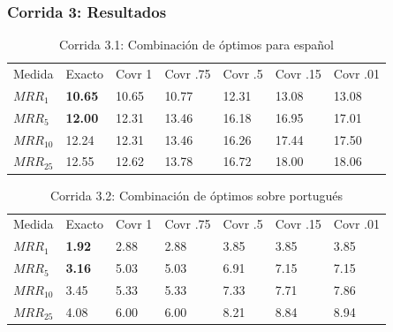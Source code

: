 \begin{frame}
\frametitle{Corrida 3: Resultados}


\begin{table}
\centering
\begin{center}
\begin{tabular}{|l | l | l | l | l | l | l |}

Medida & Exacto & Covr 1 & Covr .75 & Covr .5 & Covr .15 & Covr .01 \\ 
$MRR_{1}$ & {\color{green}\textbf{10.65}} & 10.65 & 10.77 & 12.31 & 13.08 & 13.08  \\ 
$MRR_{5}$ & {\color{green}\textbf{12.00}} & 12.31 & 13.46 & 16.18 & 16.95 & 17.01  \\ 
$MRR_{10}$ & 12.24 & 12.31 & 13.46 & 16.26 & 17.44 & 17.50  \\ 
$MRR_{25}$ & 12.55 & 12.62 & 13.78 & 16.72 & 18.00 & 18.06  \\ 
\end{tabular}
\medskip
\caption{Corrida 3.1: Combinación de óptimos para español}
\label{table:optimos}
\end{center}
\end{table}

\begin{table}
\centering
\begin{center}
\begin{tabular}{|l | l | l | l | l | l | l |}

Medida & Exacto & Covr 1 & Covr .75 & Covr .5 & Covr .15 & Covr .01 \\ 
$MRR_{1}$ & {\color{green}\textbf{1.92}} & 2.88 & 2.88 & 3.85 & 3.85 & 3.85  \\ 
$MRR_{5}$ & {\color{green}\textbf{3.16}} & 5.03 & 5.03 & 6.91 & 7.15 & 7.15  \\ 
$MRR_{10}$ & 3.45 & 5.33 & 5.33 & 7.33 & 7.71 & 7.86  \\ 
$MRR_{25}$ & 4.08 & 6.00 & 6.00 & 8.21 & 8.84 & 8.94  \\ 
\end{tabular}
\caption{Corrida 3.2: Combinación de óptimos sobre portugués}
\label{table:2_3_2_40_getExactMRRWikiFactoid_getCovrMRRWikiFactoid}
\end{center}
\end{table}

\end{frame}


